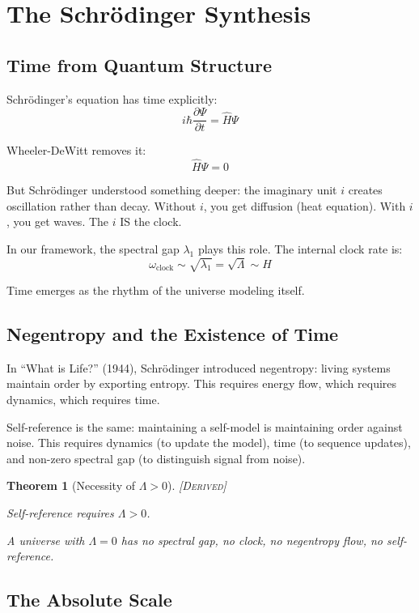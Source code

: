 \documentclass[11pt,a4paper]{article}
\newtheorem{theorem}{Theorem}[section]
\theoremstyle{definition}
\theoremstyle{remark}
\begin{document}
\section{The Schr\"odinger Synthesis}

\subsection{Time from Quantum Structure}

Schr\"odinger's equation has time explicitly:
\[
i\hbar \frac{\partial \Psi}{\partial t} = \hat{H}\Psi
\]

Wheeler-DeWitt removes it:
\[
\hat{H}\Psi = 0
\]

But Schr\"odinger understood something deeper: the imaginary unit $i$ creates oscillation rather than decay. Without $i$, you get diffusion (heat equation). With $i$, you get waves. The $i$ IS the clock.

In our framework, the spectral gap $\lambda_1$ plays this role. The internal clock rate is:
\[
\omega_{\text{clock}} \sim \sqrt{\lambda_1} = \sqrt{\Lambda} \sim H
\]

Time emerges as the rhythm of the universe modeling itself.

\subsection{Negentropy and the Existence of Time}

In ``What is Life?'' (1944), Schr\"odinger introduced negentropy: living systems maintain order by exporting entropy. This requires energy flow, which requires dynamics, which requires time.

Self-reference is the same: maintaining a self-model is maintaining order against noise. This requires dynamics (to update the model), time (to sequence updates), and non-zero spectral gap (to distinguish signal from noise).

\begin{theorem}[Necessity of $\Lambda > 0$]
\textsc{[Derived]}

Self-reference requires $\Lambda > 0$.

A universe with $\Lambda = 0$ has no spectral gap, no clock, no negentropy flow, no self-reference.
\end{theorem}

\subsection{The Absolute Scale}
\end{document}
